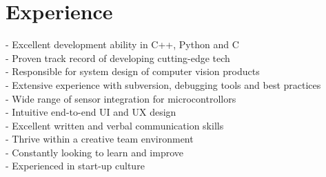 \documentclass[print]{friggeri-cv} %
\begin{document}
\section{Experience}
- Excellent development ability in C++, Python and C\\
- Proven track record of developing cutting-edge tech\\
- Responsible for system design of computer vision products\\
- Extensive experience with subversion, debugging tools and best practices\\
- Wide range of sensor integration for microcontrollors\\
- Intuitive end-to-end UI and UX design\\
- Excellent written and verbal communication skills\\
- Thrive within a creative team environment\\
- Constantly looking to learn and improve\\
- Experienced in start-up culture\\

\end{document}
